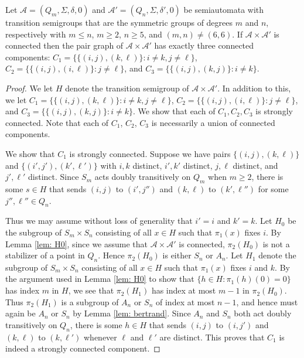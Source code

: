 \documentclass{llncs}
\newcommand{\Sig}{\Sigma}
\newcommand{\cA}{{\mathcal A}}
\begin{document}
 
\begin{lemma} 
\label{lem:main}
Let $\cA=(Q_m,\Sig, \delta,0)$ and $\cA'=(Q_n,\Sig, \delta',0)$ be 
semiautomata with transition semigroups  that are the symmetric groups  of degrees $m$ and $n$, respectively with $m\le n$, $m\ge 2$, $n\ge 5$, and $(m,n)\neq (6,6)$.  If $\cA\times \cA'$ is connected then the pair graph of $\cA\times \cA'$ has exactly three connected components:
$C_1=\{\{(i,j), (k,\ell)\}\colon i\neq k, j\neq \ell\}$, $C_2=\{\{(i,j), (i,\ell)\}\colon j\neq \ell\}$, and 
$C_3=\{\{(i,j), (k,j)\}\colon i\neq k\}$. 

\end{lemma}
\begin{proof}
We let $H$ denote the transition semigroup of $\cA\times \cA'$.  In addition to this, we let 
$C_1=\{\{(i,j), (k,\ell)\}\colon i\neq k, j\neq \ell\}$, $C_2=\{\{(i,j), (i,\ell)\}\colon j\neq \ell\}$, and 
$C_3=\{\{(i,j), (k,j)\}\colon i\neq k\}$.  We show that each of $C_1,C_2,C_3$ is strongly connected.  Note that each of $C_1$, $C_2$, $C_3$ is necessarily a union of connected components. 


We show that $C_1$ is strongly connected.  Suppose we have pairs $\{(i,j), (k,\ell)\}$ and $\{(i',j'), (k',\ell')\}$ with $i,k$ distinct, $i',k'$ distinct, $j,\ell$ distinct, and $j',\ell'$ distinct.  Since $S_m$ acts doubly transitively on $Q_m$ when $m\ge 2$,  there is some $s\in H$ that sends $(i,j)$ to $(i',j'')$ and $(k,\ell)$ to $(k',\ell'')$ for some $j'',\ell''\in Q_n$.

Thus we may assume without loss of generality that $i'=i$ and $k'=k$.  Let $H_0$ be the subgroup of $S_m\times S_n$ consisting of all $x \in H$ such that $\pi_1(x)$ fixes $i$.  By Lemma \ref{lem: H0},  since we assume that $\cA\times\cA'$ is connected,
$\pi_2(H_0)$ is not a stabilizer of a point in $Q_n$.
Hence $\pi_2(H_0)$ is either $S_n$ or $A_n$.  
Let $H_1$ denote the subgroup of $S_m\times S_n$ consisting of all $x\in H$ such that $\pi_1(x)$ fixes $i$ and $k$.  
By the argument used in Lemma \ref{lem: H0} to show that $\{h \in H\colon \pi_1(h)(0) = 0\}$ has index $m$ in $H$, we see that $\pi_2(H_1)$ has index at most $m-1$ in $\pi_2(H_0)$.  
Thus $\pi_2(H_1)$ is a subgroup of $A_n$ or $S_n$ of index at most $n-1$, and hence must again be $A_n$ or $S_n$ by Lemma \ref{lem: bertrand}.  
Since $A_n$ and $S_n$ both act doubly transitively on $Q_n$, there is some $h\in H$ that sends $(i,j)$ to $(i,j')$ and $(k,\ell)$ to $(k,\ell')$ whenever $\ell$ and $\ell'$ are distinct.  This proves that $C_1$ is indeed a strongly connected component.


\end{proof}
\end{document}
